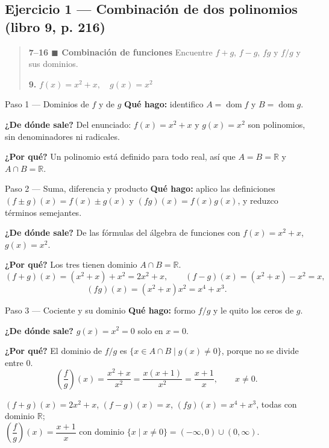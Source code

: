 \documentclass[11pt]{article}
\begin{document}
\subsection*{Ejercicio 1 — Combinación de dos polinomios (libro 9, p. 216)}

\begin{quote}
\textbf{7--16 $\blacksquare$ Combinación de funciones} \quad Encuentre $f+g$, $f-g$, $fg$ y $f/g$ y sus dominios.

\textbf{9.} $f(x)=x^2+x, \quad g(x)=x^2$
\end{quote}

\begin{paso}{Paso 1 --- Dominios de $f$ y de $g$}
\textbf{Qué hago:} identifico $A=\operatorname{dom} f$ y $B=\operatorname{dom} g$.

\textbf{¿De dónde sale?} Del enunciado: $f(x)=x^2+x$ y $g(x)=x^2$ son polinomios, sin denominadores ni radicales.

\textbf{¿Por qué?} Un polinomio está definido para todo real, así que $A=B=\mathbb{R}$ y $A\cap B=\mathbb{R}$.
\end{paso}

\begin{paso}{Paso 2 --- Suma, diferencia y producto}
\textbf{Qué hago:} aplico las definiciones $(f\pm g)(x)=f(x)\pm g(x)$ y $(fg)(x)=f(x)g(x)$, y reduzco términos semejantes.

\textbf{¿De dónde sale?} De las fórmulas del álgebra de funciones con $f(x)=x^2+x$, $g(x)=x^2$.

\textbf{¿Por qué?} Los tres tienen dominio $A\cap B=\mathbb{R}$.
\[
(f+g)(x)=(x^2+x)+x^2=2x^2+x,\qquad
(f-g)(x)=(x^2+x)-x^2=x,
\]
\[
(fg)(x)=(x^2+x)x^2=x^4+x^3 .
\]
\end{paso}

\begin{paso}{Paso 3 --- Cociente y su dominio}
\textbf{Qué hago:} formo $f/g$ y le quito los ceros de $g$.

\textbf{¿De dónde sale?} $g(x)=x^2=0$ solo en $x=0$.

\textbf{¿Por qué?} El dominio de $f/g$ es $\{x\in A\cap B\mid g(x)\neq 0\}$, porque no se divide entre $0$.
\[
\left(\frac{f}{g}\right)(x)=\frac{x^2+x}{x^2}=\frac{x(x+1)}{x^2}=\frac{x+1}{x},\qquad x\neq 0 .
\]
\end{paso}

\begin{resp}
$(f+g)(x)=2x^2+x$, $(f-g)(x)=x$, $(fg)(x)=x^4+x^3$, todas con dominio $\mathbb{R}$;\\
$\left(\dfrac{f}{g}\right)(x)=\dfrac{x+1}{x}$ con dominio $\{x\mid x\neq 0\}=(-\infty,0)\cup(0,\infty)$.
\end{resp}
\end{document}
